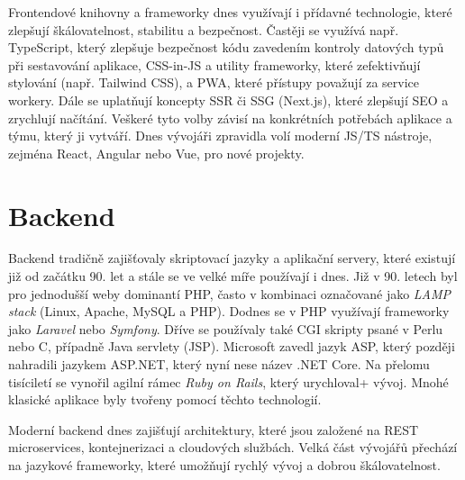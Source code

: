 Frontendové knihovny a frameworky dnes využívají i přídavné technologie,
které zlepšují škálovatelnost, stabilitu a bezpečnost. Častěji se využívá
např. TypeScript, který zlepšuje bezpečnost kódu zavedením kontroly
datových typů při sestavování aplikace, CSS-in-JS a utility frameworky,
které zefektivňují stylování (např. Tailwind CSS), a PWA, které přístupy
považují za service workery. Dále se uplatňují koncepty SSR či SSG (Next.js),
které zlepšují SEO a zrychlují načítání. Veškeré tyto volby závisí
na konkrétních potřebách aplikace a týmu, který ji vytváří. Dnes vývojáři
zpravidla volí moderní JS/TS nástroje, zejména React, Angular nebo Vue,
pro nové projekty. %

\section{Backend}

Backend tradičně zajišťovaly skriptovací jazyky a aplikační servery,
které existují již od začátku 90. let a stále se ve velké míře používají
i dnes. Již v 90. letech byl pro jednodušší weby dominantí PHP,
často v kombinaci označované jako \emph{LAMP stack} (Linux, Apache, MySQL
a PHP). Dodnes se v PHP využívají frameworky jako \emph{Laravel} nebo
\emph{Symfony}. Dříve se používaly také CGI skripty psané v Perlu nebo C,
případně Java servlety (JSP). Microsoft zavedl jazyk ASP, který později
nahradili jazykem ASP.NET, který nyní nese název .NET Core. Na přelomu
tisíciletí se vynořil agilní rámec \emph{Ruby on Rails}, který urychloval+
vývoj. Mnohé klasické aplikace byly tvořeny pomocí těchto technologií.

Moderní backend dnes zajišťují architektury, které jsou založené na REST
microservices, kontejnerizaci a cloudových službách. Velká část vývojářů
přechází na jazykové frameworky, které umožňují rychlý vývoj a dobrou
škálovatelnost.

